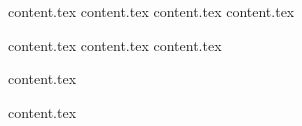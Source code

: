 \documentclass{report}
\begin{document}
    

    \newpage
    \newpage
    
    \titleformat{\chapter}{}{}{0em}{\bf\Huge}

    \afterpage{\blankpage}


    {content.tex}
    {content.tex}
    {content.tex}
    {content.tex}
    

    \tableofcontents


    
    \titleformat{\chapter}[display]{\normalfont\bfseries\Huge}{\chaptertitlename\ \thechapter}{1em}{\bf\Huge}

    \newpage

    {content.tex}
    {content.tex}
    {content.tex}

    {content.tex}

    \printbibliography

    \appendix
    {content.tex}

    \afterpage{\blankpage}

\end{document}
